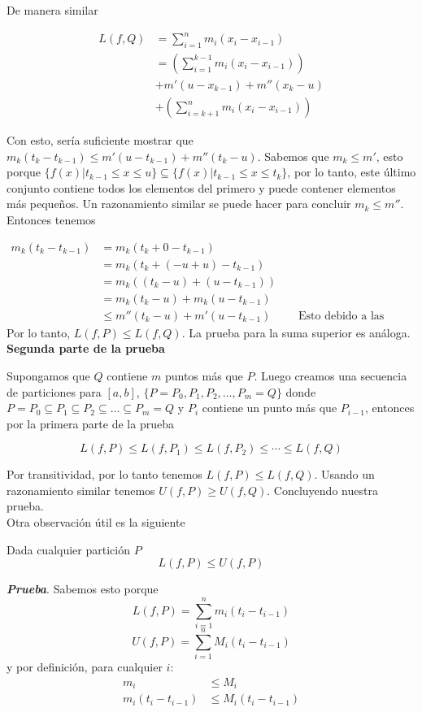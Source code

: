 \documentclass{report}
\begin{document}
    De manera similar

    \begin{align*}
        L(f,Q) &= \sum_{i=1}^{n} m_i(x_i-x_{i-1})\\
        &= \left(\sum_{i=1}^{k-1}m_i(x_i-x_{i-1})\right)\\
        &+ m'(u-x_{k-1}) + m''(x_k-u)\\
        &+ \left(\sum_{i=k+1}^{n}m_i(x_i-x_{i-1})\right)
    \end{align*}

    Con esto, sería suficiente mostrar que $m_k(t_k-t_{k-1}) \leq m'(u - t_{k-1}) + m''(t_k-u)$. Sabemos que $m_k \leq m'$, esto porque $\{f(x) | t_{k-1} \leq x \leq u\} \subseteq \{f(x) | t_{k-1} \leq x \leq t_k\}$, por lo tanto, este último conjunto contiene todos los elementos del primero y puede contener elementos más pequeños. Un razonamiento similar se puede hacer para concluir $m_k \leq m''$. Entonces tenemos

    \begin{align*}
        m_k(t_k-t_{k-1}) &= m_k(t_k+0-t_{k-1})\\
        &= m_k(t_k+(-u+u)-t_{k-1})\\
        &= m_k((t_k-u)+(u-t_{k-1}))\\
        &= m_k(t_k-u)+m_k(u-t_{k-1})\\
        &\leq m''(t_k-u) + m'(u-t_{k-1}) &&\text{ Esto debido a las propiedades de la desigualdad.}
    \end{align*}
    Por lo tanto, $L(f,P) \leq L(f, Q)$. La prueba para la suma superior es análoga.\\

    \noindent\textbf{Segunda parte de la prueba}

    Supongamos que $Q$ contiene $m$ puntos más que $P$. Luego creamos una secuencia de particiones para $[a,b]$, $\{P = P_0, P_1, P_2, \dots , P_m = Q\}$ donde $P = P_0 \subseteq P_1 \subseteq P_2 \subseteq \dots \subseteq P_m = Q$ y $P_i$ contiene un punto más que $P_{i-1}$, entonces por la primera parte de la prueba

    $$L(f,P) \leq L(f,P_1) \leq L(f,P_2) \leq \cdots \leq L(f,Q)$$

    Por transitividad, por lo tanto tenemos $L(f,P) \leq L(f,Q)$. Usando un razonamiento similar tenemos $U(f,P) \geq U(f,Q)$. Concluyendo nuestra prueba.\\

    Otra observación útil es la siguiente

    \begin{lemBox}
        Dada cualquier partición $P$
        $$L(f, P) \leq U(f, P)$$
    \end{lemBox}
    \textit{\textbf{Prueba}}. Sabemos esto porque
    $$L(f, P) = \sum_{i=1}^{n}m_i(t_{i} - t_{i-1})$$
    $$U(f, P) = \sum_{i=1}^{n}M_i(t_{i} - t_{i-1})$$
    y por definición, para cualquier $i$:
    \begin{align*}
        m_i &\leq M_i\\
        m_i(t_{i} - t_{i-1}) &\leq M_i(t_{i} - t_{i-1})
    \end{align*}
\end{document}
